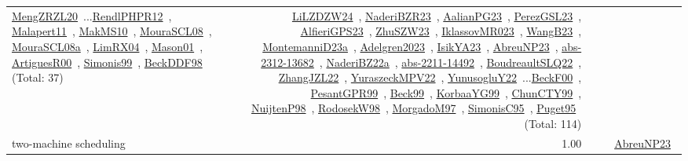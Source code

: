 {\begin{longtable}{p{3cm}r>{\raggedright\arraybackslash}p{6cm}>{\raggedright\arraybackslash}p{6cm}>{\raggedright\arraybackslash}p{8cm}}
\href{../works/MengZRZL20.pdf}{MengZRZL20}~\cite{MengZRZL20}...\href{../works/RendlPHPR12.pdf}{RendlPHPR12}~\cite{RendlPHPR12}, \href{../works/Malapert11.pdf}{Malapert11}~\cite{Malapert11}, \href{../works/MakMS10.pdf}{MakMS10}~\cite{MakMS10}, \href{../works/MouraSCL08.pdf}{MouraSCL08}~\cite{MouraSCL08}, \href{../works/MouraSCL08a.pdf}{MouraSCL08a}~\cite{MouraSCL08a}, \href{../works/LimRX04.pdf}{LimRX04}~\cite{LimRX04}, \href{../works/Mason01.pdf}{Mason01}~\cite{Mason01}, \href{../works/ArtiguesR00.pdf}{ArtiguesR00}~\cite{ArtiguesR00}, \href{../works/Simonis99.pdf}{Simonis99}~\cite{Simonis99}, \href{../works/BeckDDF98.pdf}{BeckDDF98}~\cite{BeckDDF98} (Total: 37) & \href{../works/LiLZDZW24.pdf}{LiLZDZW24}~\cite{LiLZDZW24}, \href{../works/NaderiBZR23.pdf}{NaderiBZR23}~\cite{NaderiBZR23}, \href{../works/AalianPG23.pdf}{AalianPG23}~\cite{AalianPG23}, \href{../works/PerezGSL23.pdf}{PerezGSL23}~\cite{PerezGSL23}, \href{../works/AlfieriGPS23.pdf}{AlfieriGPS23}~\cite{AlfieriGPS23}, \href{../works/ZhuSZW23.pdf}{ZhuSZW23}~\cite{ZhuSZW23}, \href{../works/IklassovMR023.pdf}{IklassovMR023}~\cite{IklassovMR023}, \href{../works/WangB23.pdf}{WangB23}~\cite{WangB23}, \href{../works/MontemanniD23a.pdf}{MontemanniD23a}~\cite{MontemanniD23a}, \href{../works/Adelgren2023.pdf}{Adelgren2023}~\cite{Adelgren2023}, \href{../works/IsikYA23.pdf}{IsikYA23}~\cite{IsikYA23}, \href{../works/AbreuNP23.pdf}{AbreuNP23}~\cite{AbreuNP23}, \href{../works/abs-2312-13682.pdf}{abs-2312-13682}~\cite{abs-2312-13682}, \href{../works/NaderiBZ22a.pdf}{NaderiBZ22a}~\cite{NaderiBZ22a}, \href{../works/abs-2211-14492.pdf}{abs-2211-14492}~\cite{abs-2211-14492}, \href{../works/BoudreaultSLQ22.pdf}{BoudreaultSLQ22}~\cite{BoudreaultSLQ22}, \href{../works/ZhangJZL22.pdf}{ZhangJZL22}~\cite{ZhangJZL22}, \href{../works/YuraszeckMPV22.pdf}{YuraszeckMPV22}~\cite{YuraszeckMPV22}, \href{../works/YunusogluY22.pdf}{YunusogluY22}~\cite{YunusogluY22}...\href{../works/BeckF00.pdf}{BeckF00}~\cite{BeckF00}, \href{../works/PesantGPR99.pdf}{PesantGPR99}~\cite{PesantGPR99}, \href{../works/Beck99.pdf}{Beck99}~\cite{Beck99}, \href{../works/KorbaaYG99.pdf}{KorbaaYG99}~\cite{KorbaaYG99}, \href{../works/ChunCTY99.pdf}{ChunCTY99}~\cite{ChunCTY99}, \href{../works/NuijtenP98.pdf}{NuijtenP98}~\cite{NuijtenP98}, \href{../works/RodosekW98.pdf}{RodosekW98}~\cite{RodosekW98}, \href{../works/MorgadoM97.pdf}{MorgadoM97}~\cite{MorgadoM97}, \href{../works/SimonisC95.pdf}{SimonisC95}~\cite{SimonisC95}, \href{../works/Puget95.pdf}{Puget95}~\cite{Puget95} (Total: 114)\\
\index{two-machine scheduling}\index{Concepts!two-machine scheduling}two-machine scheduling &  1.00 &  &  & \href{../works/AbreuNP23.pdf}{AbreuNP23}~\cite{AbreuNP23}\\

\end{longtable}}
